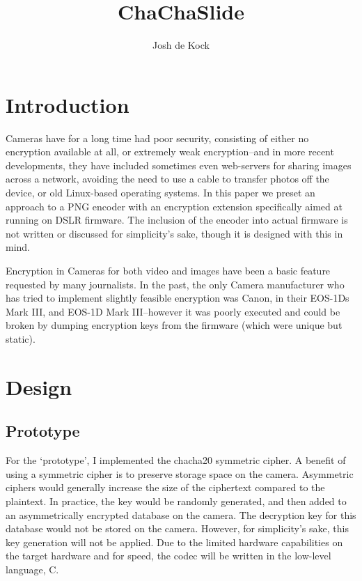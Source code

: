 \documentclass{article}
\begin{document}
\title{ChaChaSlide}
\author{Josh de Kock}

\maketitle

\section{Introduction}

Cameras have for a long time had poor security, consisting of either no encryption available at all, or extremely weak encryption--and in more recent developments, they have included sometimes even web-servers for sharing images across a network, avoiding the need to use a cable to transfer photos off the device, or old Linux-based operating systems. In this paper we preset an approach to a PNG encoder with an encryption extension specifically aimed at running on DSLR firmware. The inclusion of the encoder into actual firmware is not written or discussed for simplicity's sake, though it is designed with this in mind.

Encryption in Cameras for both video and images have been a basic feature requested by many journalists\cite{freedompress}. In the past, the only Camera manufacturer who has tried to implement slightly feasible encryption was Canon, in their EOS-1Ds Mark III, and EOS-1D Mark III\cite{canonenc}--however it was poorly executed and could be broken by dumping encryption keys from the firmware (which were unique but static)\cite{stackoverflow}.

\section{Design}

\subsection{Prototype}

For the `prototype', I implemented the chacha20 symmetric cipher. A benefit of using a symmetric cipher is to preserve storage space on the camera. Asymmetric ciphers would generally increase the size of the ciphertext compared to the plaintext. In practice, the key would be randomly generated, and then added to an asymmetrically encrypted database on the camera. The decryption key for this database would not be stored on the camera. However, for simplicity's sake, this key generation will not be applied. Due to the limited hardware capabilities on the target hardware and for speed, the codec will be written in the low-level language, C.
\end{document}
